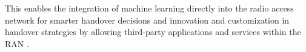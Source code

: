 This enables the integration of machine learning directly into the radio access network for smarter handover decisions and innovation and customization in handover strategies by allowing third-party applications and services within the RAN  \cite{niknam_intelligent_2020}. 


